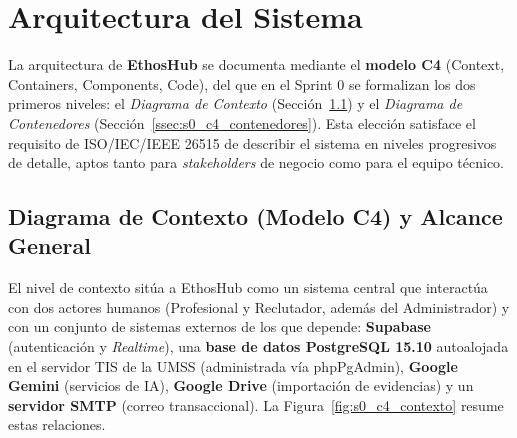 \section{Arquitectura del Sistema}
\label{sec:s0_arquitectura}

La arquitectura de \textbf{EthosHub} se documenta mediante el \textbf{modelo C4} (Context,
Containers, Components, Code), del que en el Sprint 0 se formalizan los dos primeros niveles:
el \textit{Diagrama de Contexto} (Sección~\ref{ssec:s0_c4_contexto}) y el \textit{Diagrama de
Contenedores} (Sección~\ref{ssec:s0_c4_contenedores}). Esta elección satisface el requisito de
ISO/IEC/IEEE 26515 de describir el sistema en niveles progresivos de detalle, aptos tanto para
\textit{stakeholders} de negocio como para el equipo técnico.\par

\subsection{Diagrama de Contexto (Modelo C4) y Alcance General}
\label{ssec:s0_c4_contexto}

El nivel de contexto sitúa a EthosHub como un sistema central que interactúa con dos actores
humanos (Profesional y Reclutador, además del Administrador) y con un conjunto de sistemas
externos de los que depende: \textbf{Supabase} (autenticación y \textit{Realtime}), una
\textbf{base de datos PostgreSQL 15.10} autoalojada en el servidor TIS de la UMSS
(administrada vía phpPgAdmin), \textbf{Google Gemini} (servicios de IA), \textbf{Google Drive}
(importación de evidencias) y un \textbf{servidor SMTP} (correo transaccional). La
Figura~\ref{fig:s0_c4_contexto} resume estas relaciones.

